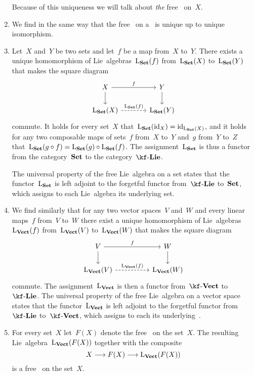 \begin{remark}
\begin{enumerate}
			Because of this uniqueness we will talk about \emph{the} free~\liealgebra{$\kf$} on~$X$.
		\item
			We find in the same way that the free~\liealgebra{$\kf$} on a~\vectorspace{$\kf$} is unique up to unique isomorphism.
		\item
			Let~$X$ and~$Y$ be two sets and let~$f$ be a map from~$X$ to~$Y$.
			There exists a unique homomorphism of Lie~algebras~$\operatorname{L}_{\mathbf{Set}}(f)$ from~$\operatorname{L}_{\mathbf{Set}}(X)$ to~$\operatorname{L}_{\mathbf{Set}}(Y)$ that makes the square diagram
			\[
				\begin{tikzcd}[column sep = large]
					X
					\arrow{r}[above]{f}
					\arrow{d}
					&
					Y
					\arrow{d}
					\\
					\freelieset(X)
					\arrow[dashed]{r}[above]{\freelieset(f)}
					&
					\freelieset(Y)
				\end{tikzcd}
			\]
			commute.
			It holds for every set~$X$ that~$\operatorname{L}_{\mathbf{Set}}(\mathrm{id}_X) = \mathrm{id}_{\operatorname{L}_{\mathbf{Set}}(X)}$, and it holds for any two composable maps of sets~$f$ from~$X$ to~$Y$ and~$g$ from~$Y$ to~$Z$ that~$\operatorname{L}_{\mathbf{Set}}(g \circ f) = \operatorname{L}_{\mathbf{Set}}(g) \circ \operatorname{L}_{\mathbf{Set}}(f)$.
			The assignment~$\operatorname{L}_{\mathbf{Set}}$ is thus a functor from the category~$\mathbf{Set}$ to the category~$\cLie{\kf}$.
			
			The universal property of the free Lie~algebra on a set states that the functor~$\operatorname{L}_{\mathbf{Set}}$ is left adjoint to the forgetful functor from~$\cLie{\kf}$ to~$\mathbf{Set}$, which assigns to each Lie~algebra its underlying set.
		\item
			We find similarly that for any two vector spaces~$V$ and~$W$ and every linear maps~$f$ from~$V$ to~$W$ there exist a unique homomorphism of Lie~algebras~$\operatorname{L}_{\mathbf{Vect}}(f)$ from~$\operatorname{L}_{\mathbf{Vect}}(V)$ to~$\operatorname{L}_{\mathbf{Vect}}(W)$ that makes the square diagram
			\[
				\begin{tikzcd}[column sep = huge]
					V
					\arrow{r}[above]{f}
					\arrow{d}
					&
					W
					\arrow{d}
					\\
					\freelievect(V)
					\arrow[dashed]{r}[above]{\freelievect(f)}
					&
					\freelievect(W)
				\end{tikzcd}
			\]
			commute.
			The assignment~$\operatorname{L}_{\mathbf{Vect}}$ is then a functor from~$\cVect{\kf}$ to~$\cLie{\kf}$.
			The universal property of the free Lie~algebra on a vector space states that the functor~$\operatorname{L}_{\mathbf{Vect}}$ is left adjoint to the forgetful functor from~$\cLie{\kf}$ to~$\cVect{\kf}$, which assigns to each \liealgebra{$\kf$} its underlying~\vectorspace{$\kf$}.
		\item
			For every set~$X$ let~$F(X)$ denote the free~\vectorspace{$\kf$} on the set~$X$.
			The resulting Lie~algebra~$\operatorname{L}_{\mathbf{Vect}}(F(X))$ together with the composite
			\[
				X
				\to
				F(X)
				\to
				\freelievect(F(X))
			\]
			is a free~\liealgebra{$\kf$} on the set~$X$.


\end{enumerate}
\end{remark}
